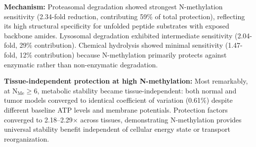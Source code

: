 \documentclass[10pt,letterpaper]{article}
\begin{document}
\begin{table}[H]
\centering
\caption{N-Methylation Protection in Tumor Tissue}
\label{tab:stability_tumor}
\end{table}

\textbf{Mechanism:} Proteasomal degradation showed strongest N-methylation sensitivity (2.34-fold reduction, contributing 59\% of total protection), reflecting its high structural specificity for unfolded peptide substrates with exposed backbone amides. Lysosomal degradation exhibited intermediate sensitivity (2.04-fold, 29\% contribution). Chemical hydrolysis showed minimal sensitivity (1.47-fold, 12\% contribution) because N-methylation primarily protects against enzymatic rather than non-enzymatic degradation.

\textbf{Tissue-independent protection at high N-methylation:} Most remarkably, at N$_{\text{Me}} \geq 6$, metabolic stability became tissue-independent: both normal and tumor models converged to identical coefficient of variation (0.61\%) despite different baseline ATP levels and membrane potentials. Protection factors converged to 2.18--2.29$\times$ across tissues, demonstrating N-methylation provides universal stability benefit independent of cellular energy state or transport reorganization.
\end{document}
